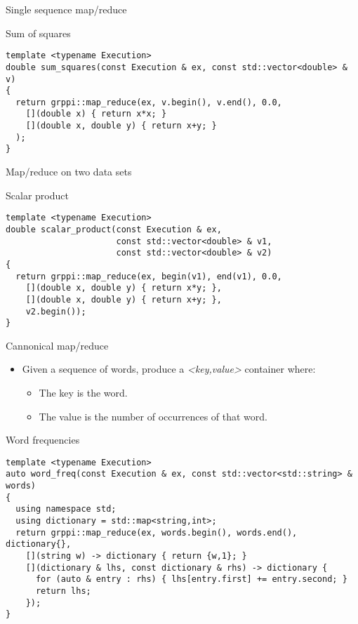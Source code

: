 \begin{frame}[t,fragile]{Single sequence map/reduce}
\begin{block}{Sum of squares}
\begin{lstlisting}
template <typename Execution>
double sum_squares(const Execution & ex, const std::vector<double> & v)
{
  return grppi::map_reduce(ex, v.begin(), v.end(), 0.0,
    [](double x) { return x*x; }
    [](double x, double y) { return x+y; }
  );
}
\end{lstlisting}
\end{block}
\end{frame}

\begin{frame}[t,fragile]{Map/reduce on two data sets}
\begin{block}{Scalar product}
\begin{lstlisting}
template <typename Execution>
double scalar_product(const Execution & ex,
                      const std::vector<double> & v1,
                      const std::vector<double> & v2)
{
  return grppi::map_reduce(ex, begin(v1), end(v1), 0.0,
    [](double x, double y) { return x*y; },
    [](double x, double y) { return x+y; },
    v2.begin());
}
\end{lstlisting}
\end{block}
\end{frame}

\begin{frame}[t,fragile]{Cannonical map/reduce}
\begin{itemize}
  \item Given a sequence of words, produce a \emph{<key,value>} container where:
    \begin{itemize}
      \item The key is the word.
      \item The value is the number of occurrences of that word.
    \end{itemize}
\end{itemize}
\vfill\pause
\begin{block}{Word frequencies}
\begin{lstlisting}
template <typename Execution>
auto word_freq(const Execution & ex, const std::vector<std::string> & words)
{
  using namespace std;
  using dictionary = std::map<string,int>;
  return grppi::map_reduce(ex, words.begin(), words.end(), dictionary{},
    [](string w) -> dictionary { return {w,1}; }
    [](dictionary & lhs, const dictionary & rhs) -> dictionary {
      for (auto & entry : rhs) { lhs[entry.first] += entry.second; }
      return lhs;
    });
}
\end{lstlisting}
\end{block}
\end{frame}
